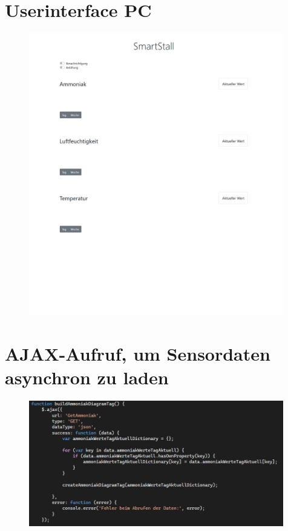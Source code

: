 \documentclass[conference]{IEEEtran}
\begin{document}
\begin{appendices}
\section{Userinterface PC}
\label{sec:uiPCAnhang}
\begin{figure}[h]
    \centering
    \includegraphics[width=0.99\textwidth]{fig/uiPC.jpg}
\end{figure}

\clearpage
\section{AJAX-Aufruf, um Sensordaten asynchron zu laden}
\label{sec:ajaxAnhang}
\begin{figure}[h]
    \centering
    \includegraphics[width=0.99\textwidth]{fig/ajax.JPG}
\end{figure}


\end{appendices}
\end{document}
